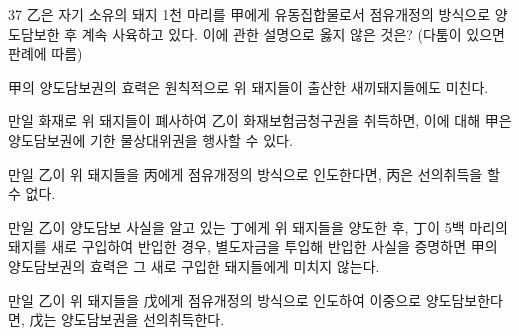 \begin{question}{37}
乙은 자기 소유의 돼지 1천 마리를 甲에게 유동집합물로서 점유개정의 방식으로 양도담보한 후 계속 사육하고 있다. 이에 관한 설명으로 옳지 않은 것은? (다툼이 있으면 판례에 따름)
\begin{choices}
  \item 甲의 양도담보권의 효력은 원칙적으로 위 돼지들이 출산한 새끼돼지들에도 미친다.
  \item 만일 화재로 위 돼지들이 폐사하여 乙이 화재보험금청구권을 취득하면, 이에 대해 甲은 양도담보권에 기한 물상대위권을 행사할 수 있다.
  \item 만일 乙이 위 돼지들을 丙에게 점유개정의 방식으로 인도한다면, 丙은 선의취득을 할 수 없다.
  \item 만일 乙이 양도담보 사실을 알고 있는 丁에게 위 돼지들을 양도한 후, 丁이 5백 마리의 돼지를 새로 구입하여 반입한 경우, 별도자금을 투입해 반입한 사실을 증명하면 甲의 양도담보권의 효력은 그 새로 구입한 돼지들에게 미치지 않는다.
  \item 만일 乙이 위 돼지들을 戊에게 점유개정의 방식으로 인도하여 이중으로 양도담보한다면, 戊는 양도담보권을 선의취득한다.
\end{choices}
\end{question}
